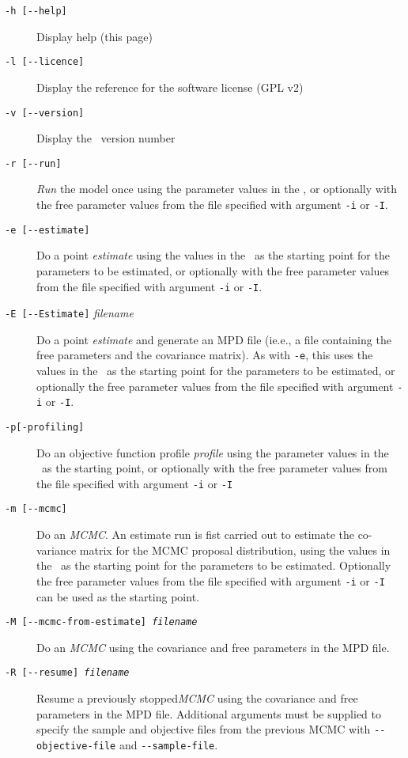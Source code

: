 \begin{description}
\item [\texttt{-h [-{}-help]}] Display help (this page)
\item [\texttt{-l [-{}-licence]}] Display the reference for the software license (GPL v2)
\item [\texttt{-v [-{}-version]}] Display the \CNAME\ version number

\item [\texttt{-r [-{}-run]}] \emph{Run} the model once using the parameter values in the \config, or optionally with the free parameter values from the file specified with argument \texttt{-i} or \texttt{-I}.
\item [\texttt{-e [-{}-estimate]}] Do a point \emph{estimate} using the values in the \config\ as the starting point for the parameters to be estimated, or optionally with the free parameter values from the file specified with argument \texttt{-i} or \texttt{-I}.
\item [\texttt{-E [-{}-Estimate]} \emph{filename}] Do a point \emph{estimate} and generate an MPD file (ie.e., a file containing the free parameters and the covariance matrix). As with \texttt{-e}, this uses the values in the \config\ as the starting point for the parameters to be estimated, or optionally the free parameter values from the file specified with argument \texttt{-i} or \texttt{-I}.
\item [\texttt{-{p}[-profiling]}] Do an objective function profile \emph{profile} using the parameter values in the \config\ as the starting point, or optionally with the free parameter values from the file specified with argument \texttt{-i} or \texttt{-I}
\item [\texttt{-m [-{}-mcmc]}] Do an \emph{MCMC}. An estimate run is fist carried out to estimate the co-variance matrix for the MCMC proposal distribution, using the values in the \config\ as the starting point for the parameters to be estimated. Optionally the free parameter values from the file specified with argument \texttt{-i} or \texttt{-I} can be used as the starting point.
\item [\texttt{-M [-{}-mcmc-from-estimate] \emph{filename}}] Do an \emph{MCMC} using the covariance and free parameters in the MPD file.
\item [\texttt{-R [-{}-resume] \emph{filename}}] Resume a previously stopped\emph{MCMC} using the covariance and free parameters in the MPD file. Additional arguments must be supplied to specify the sample and objective files from the previous MCMC with \texttt{-{}-objective-file} and \texttt{-{}-sample-file}.

\end{description}
